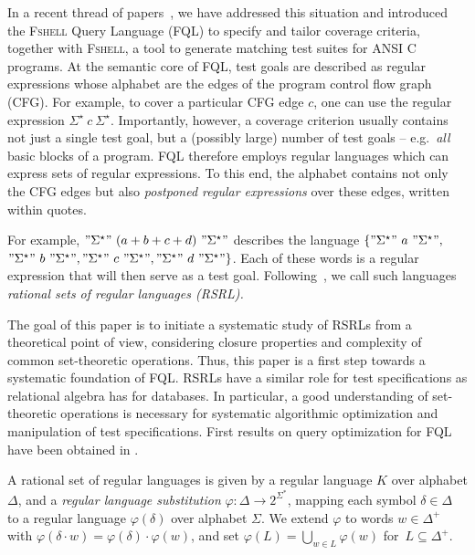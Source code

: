 \documentclass[envcountsame]{llncs}
\newcommand{\RegularlyGeneratedLanguageSets}{rational sets of regular languages\xspace}
\newcommand{\RegularlyGeneratedLanguageSet}{rational set of regular languages\xspace}
\newcommand{\RegularlyGeneratedLanguageSetAbbrev}{RSRL\xspace}
\newcommand{\RegularlyGeneratedLanguageSetsAbbrev}{RSRLs\xspace}
\newcommand{\FSHELL}{\textsc{Fshell}\xspace}
\newcommand{\FQL}{FQL\xspace}
\begin{document}
In a recent thread of
papers~\cite{FQL-ASE,holzer11:_seaml_testin_for_model_and_code,holzer10:_introd_to_test_specif_in_fql,holzer09:_query_dirven_progr_testin,holzer08,DBLP:conf/esop/BeyerHTV13},
we have addressed this situation and introduced the \FSHELL Query
Language (\FQL) to specify and tailor coverage criteria, together with
\FSHELL, a tool to generate matching test suites for ANSI C programs.
At the semantic core of \FQL, test goals are described as regular expressions whose alphabet are the edges
of the program control flow graph (CFG). For example, to cover a particular CFG edge $c$, one can use the
regular expression $\Sigma^\star\ c\ \Sigma^\star$. Importantly, however, a coverage criterion usually contains
not just a single test goal, but a (possibly large) number of test goals -- e.g.~{\em all} basic blocks
of a program. \FQL therefore employs regular languages which can express sets of regular expressions.
To this end, the alphabet contains not only the CFG edges but also \emph{postponed regular expressions} over these edges, written within quotes.

For example, $"\Sigma^\star"\ (a + b+ c +d)\ "\Sigma^\star"$ describes the language $\{"\Sigma^\star"\ a\ "\Sigma^\star",$  $"\Sigma^\star"\ b\ "\Sigma^\star", "\Sigma^\star"\ c\ "\Sigma^\star", "\Sigma^\star"\ d\ "\Sigma^\star"\}$. Each of these words is a regular expression that will then serve as a test goal. Following~\cite{membership},
  we call such languages \emph{\RegularlyGeneratedLanguageSets
  (\RegularlyGeneratedLanguageSetAbbrev).}

The goal of this paper is to initiate a systematic study of \RegularlyGeneratedLanguageSetsAbbrev from a
theoretical point of view, considering closure properties and complexity of common set-theoretic operations.
Thus, this paper is a first step towards a systematic foundation of \FQL. \RegularlyGeneratedLanguageSetsAbbrev have
a similar role for test specifications as relational algebra has for databases. In particular, a good understanding
of set-theoretic operations is necessary for systematic algorithmic optimization and manipulation of test specifications.
First results on query optimization for \FQL have been obtained in \cite{DBLP:conf/esop/BeyerHTV13}.

A \RegularlyGeneratedLanguageSet is given by a regular
language $K$ over alphabet $\Delta$, and a \emph{regular language
  substitution} $\varphi : \Delta \rightarrow 2^{\Sigma^*}$, mapping
each symbol $\delta\in \Delta$ to a regular language $\varphi(\delta)$
over alphabet $\Sigma$.
We extend $\varphi$ to words $w \in \Delta^+$ with $\varphi(\delta
\cdot w) = \varphi(\delta) \cdot \varphi(w)$, and set $\varphi(L) =
\bigcup_{w \in L}\varphi(w)$ for~$L \subseteq \Delta^+$.
\end{document}
